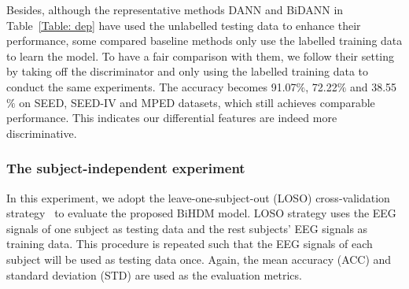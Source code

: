 \documentclass[journal]{IEEEtran}
\begin{document}
Besides,  although the representative methods DANN and BiDANN in Table~\ref{Table: dep} have used the unlabelled testing data to enhance their performance, some compared baseline methods only use the labelled training data to learn the model. To have a fair comparison with them, we follow their setting by taking off the discriminator and only using the labelled training data to conduct the same experiments. The accuracy becomes 91.07$\%$, 72.22$\%$ and 38.55$\%$ on SEED, SEED-IV and MPED datasets, which still achieves comparable performance. This indicates our differential features are indeed more discriminative.

\subsubsection{The subject-independent experiment}
In this experiment, we adopt the leave-one-subject-out (LOSO) cross-validation strategy~\cite{zheng2016personalizing} to evaluate the proposed BiHDM model. LOSO strategy uses the EEG signals of one subject as testing data and the rest subjects' EEG signals as training data. This procedure is repeated such that the EEG signals of each subject will be used as testing data once. Again, the mean accuracy (ACC) and standard deviation (STD) are used as the evaluation metrics. 
\end{document}
